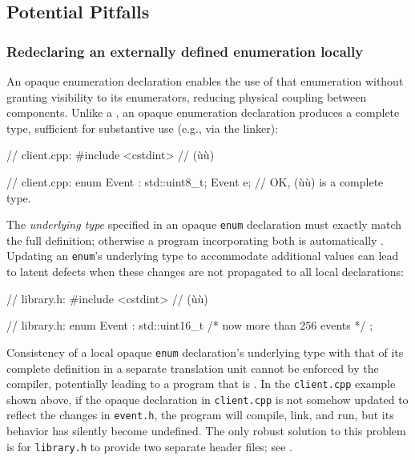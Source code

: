 \subsection[Potential Pitfalls]{Potential Pitfalls}\label{potential-pitfalls-opaqueenum}

\subsubsection[Redeclaring an externally defined enumeration locally]{Redeclaring an externally defined enumeration locally}\label{redeclaring-an-externally-defined-enumeration-locally}

An opaque enumeration declaration enables the use of that
enumeration without granting visibility to its enumerators, reducing
physical coupling between components. Unlike a , an opaque enumeration declaration produces a complete
type, sufficient for substantive use (e.g., via the linker):

\begin{emcppshiddenlisting}[emcppsbatch=e8]
// client.cpp:
#include <cstdint>  // (ù{}ù)
\end{emcppshiddenlisting}
\begin{emcppslisting}[emcppsbatch=e8]
// client.cpp:
enum Event : std::uint8_t;
Event e;  // OK, (ù{}ù) is a complete type.
\end{emcppslisting}

\noindent The \emph{underlying type} specified in an opaque \lstinline!enum!
declaration must exactly match the full definition; otherwise a program
incorporating both is automatically . Updating an
\lstinline!enum!'s underlying type to accommodate additional values can
lead to latent defects when these changes are not propagated to all
local declarations:

\begin{emcppshiddenlisting}[emcppsbatch=e9]
// library.h:
#include <cstdint>  // (ù{}ù)
\end{emcppshiddenlisting}
\begin{emcppslisting}[emcppsbatch=e9]
// library.h:
enum Event : std::uint16_t { /* now more than 256 events */ };
\end{emcppslisting}

\noindent Consistency of a local opaque \lstinline!enum! declaration's underlying
type with that of its complete definition in a separate translation unit
cannot be enforced by the compiler, potentially leading to a program
that is . In the \lstinline!client.cpp! example shown above, if the opaque
declaration in \lstinline!client.cpp! is not somehow updated to reflect the
changes in \lstinline!event.h!, the program will compile, link, and run,
but its behavior has silently become undefined. The only robust solution
to this problem is for \lstinline!library.h! to provide two separate header
files; see .

